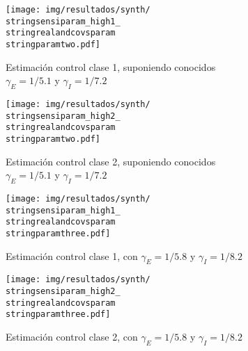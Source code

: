 \begin{figure}[!h]
\centering
\begin{subfigure}[b]{0.47\textwidth}
     \centering
     \texttt{[image: img/resultados/synth/\\stringsensiparam\_high1\_\\stringrealandcovsparam\\stringparamtwo.pdf]}
     \caption{Estimación control clase 1, suponiendo conocidos \(\gamma_E = 1/5.1\) y \(\gamma_I = 1/7.2\)}
     \label{fig:legend-sensi-b-class1-gamma_real}
\end{subfigure} 
\hfill
\begin{subfigure}[b]{0.47\textwidth}
     \centering
     \texttt{[image: img/resultados/synth/\\stringsensiparam\_high2\_\\stringrealandcovsparam\\stringparamtwo.pdf]}
     \caption{Estimación control clase 2,  suponiendo conocidos \(\gamma_E = 1/5.1\) y \(\gamma_I = 1/7.2\)}
     \label{fig:legend-sensi-b-class2-gamma_real}
\end{subfigure} 
\hfill
\begin{subfigure}[b]{0.47\textwidth}
     \centering
     \texttt{[image: img/resultados/synth/\\stringsensiparam\_high1\_\\stringrealandcovsparam\\stringparamthree.pdf]}
     \caption{Estimación control clase 1,  con \(\gamma_E = 1/5.8\) y \(\gamma_I = 1/8.2\)}
     \label{fig:legend-sensi-b-class1-gamma_estimado}
\end{subfigure} 
\hfill
\begin{subfigure}[b]{0.47\textwidth}
     \centering
     \texttt{[image: img/resultados/synth/\\stringsensiparam\_high2\_\\stringrealandcovsparam\\stringparamthree.pdf]}
     \caption{Estimación control clase 2,  con \(\gamma_E = 1/5.8\) y \(\gamma_I = 1/8.2\)}
     \label{fig:legend-sensi-b-class2-gamma_estimado}
\end{subfigure} 
\hfill
\begin{subfigure}[b]{0.75\textwidth}
 \centering
{}
\end{subfigure}
\end{figure}
